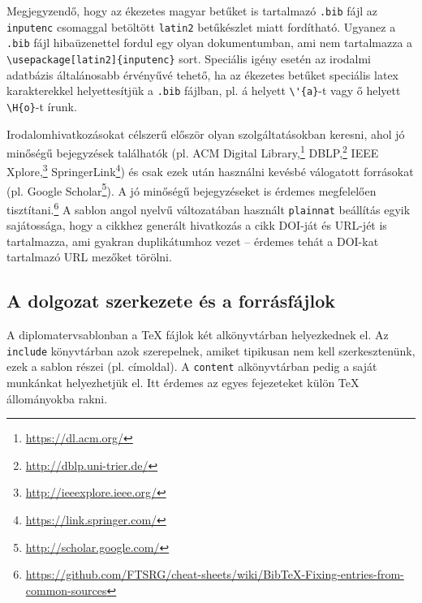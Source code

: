 Megjegyzendő, hogy az ékezetes magyar betűket is tartalmazó \verb+.bib+ fájl az \verb+inputenc+ csomaggal betöltött \verb+latin2+ betűkészlet miatt fordítható. Ugyanez a \verb+.bib+ fájl hibaüzenettel fordul egy olyan dokumentumban, ami nem tartalmazza a \verb+\usepackage[latin2]{inputenc}+ sort. Speciális igény esetén az irodalmi adatbázis általánosabb érvényűvé tehető, ha az ékezetes betűket speciális latex karakterekkel helyettesítjük a \verb+.bib+ fájlban, pl. á helyett \verb+\'{a}+-t vagy ő helyett \verb+\H{o}+-t írunk.

Irodalomhivatkozásokat célszerű először olyan szolgáltatásokban keresni, ahol jó minőségű bejegyzések találhatók (pl. ACM Digital Library,\footnote{\url{https://dl.acm.org/}} DBLP,\footnote{\url{http://dblp.uni-trier.de/}} IEEE Xplore,\footnote{\url{http://ieeexplore.ieee.org/}} SpringerLink\footnote{\url{https://link.springer.com/}}) és csak ezek után használni kevésbé válogatott forrásokat (pl. Google Scholar\footnote{\url{http://scholar.google.com/}}). A jó minőségű bejegyzéseket is érdemes megfelelően tisztítani.\footnote{\url{https://github.com/FTSRG/cheat-sheets/wiki/BibTeX-Fixing-entries-from-common-sources}} A sablon angol nyelvű változatában használt \texttt{plainnat} beállítás egyik sajátossága, hogy a cikkhez generált hivatkozás a cikk DOI-ját és URL-jét is tartalmazza, ami gyakran duplikátumhoz vezet -- érdemes tehát a DOI-kat tartalmazó URL mezőket törölni. 

\subsection{A dolgozat szerkezete és a forrásfájlok}
A diplomatervsablonban a TeX fájlok két alkönyvtárban helyezkednek el. Az \verb+include+ könyvtárban azok szerepelnek, amiket tipikusan nem kell szerkesztenünk, ezek a sablon részei (pl. címoldal). A \verb+content+ alkönyvtárban pedig a saját munkánkat helyezhetjük el. Itt érdemes az egyes fejezeteket külön \TeX{} állományokba rakni.

